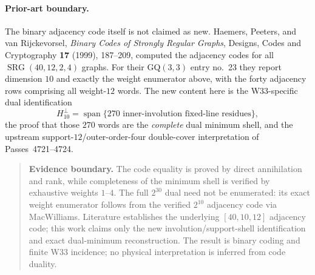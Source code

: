 \paragraph{Prior-art boundary.}
The binary adjacency code itself is not claimed as new.  Haemers, Peeters, and
van Rijckevorsel, \emph{Binary Codes of Strongly Regular Graphs}, Designs,
Codes and Cryptography \textbf{17} (1999), 187--209, computed the adjacency
codes for all $\operatorname{SRG}(40,12,2,4)$ graphs.  For their GQ$(3,3)$
entry no.~23 they report dimension $10$ and exactly the weight enumerator above,
with the forty adjacency rows comprising all weight-$12$ words.  The new content
here is the W33-specific dual identification
\[
 H_{10}^{\perp}=\operatorname{span}\{\text{270 inner-involution fixed-line residues}\},
\]
the proof that those $270$ words are the \emph{complete} dual minimum shell,
and the upstream support-$12$/outer-order-four double-cover interpretation of
Passes~4721--4724.

\begin{quote}\small
\textbf{Evidence boundary.}
The code equality is proved by direct annihilation and rank, while completeness
of the minimum shell is verified by exhaustive weights $1$--$4$.  The full
$2^{30}$ dual need not be enumerated: its exact weight enumerator follows from
the verified $2^{10}$ adjacency code via MacWilliams.  Literature establishes
the underlying $[40,10,12]$ adjacency code; this work claims only the new
involution/support-shell identification and exact dual-minimum reconstruction.
The result is binary coding and finite W33 incidence; no physical interpretation
is inferred from code duality.
\end{quote}